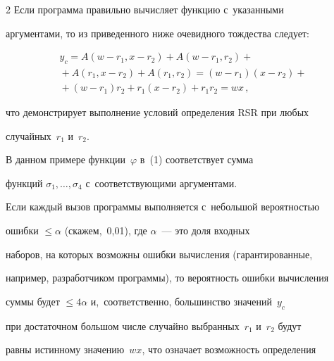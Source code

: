 \begin{multicols}{2}
    Если программа правильно вычисляет функцию с~указанными 


аргументами, то из приведенного ниже очевидного тождества следует:





\vspace*{-5pt}





\noindent


    \begin{multline}


    y_c = A\left(w-r_1, x-r_2\right) + A\left(w-r_1, r_2\right) + {}\\


    {}+A\left(r_1, x-r_2\right) + 


A\left(r_1, r_2\right) = \left(w-r_1\right)\left(x-r_2\right) + {}\\


{}+ \left(w-r_1\right)r_2 + r_1\left(x-r_2\right) + 


r_1r_2 = wx\,,


    \label{e2-bf}


    \end{multline}


    что демонстрирует выполнение условий определения RSR при любых 


случайных~$r_1$ и~$r_2$.





    В данном примере функции~$\varphi$ в~(1) соответствует сумма 


функций $\sigma_1, \ldots, \sigma_4$ с~соответствующими аргументами.


    


    Если каждый вызов программы выполняется с~небольшой вероятностью 


ошибки $\leq\alpha$ (скажем,~0,01), где $\alpha$~--- это доля входных 


наборов, на которых возможны ошибки вычисления (гарантированные, 


например, разработчиком программы), то вероятность ошибки вычисления 


суммы будет $\leq 4\alpha$ и,~соответственно, большинство значений~$y_c$ 


при достаточном большом числе случайно выбранных~$r_1$ и~$r_2$ будут 


равны истинному значению~$wx$, что означает возможность определения 



\end{multicols}
